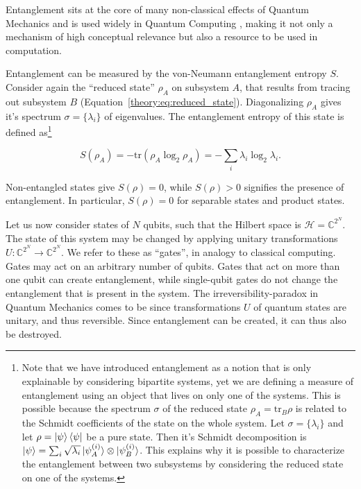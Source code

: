 \documentclass[reprint,amsmath,amssymb,aps,prb,nofootinbib]{revtex4-2}
\begin{document}
    Entanglement sits at the core of many non-classical effects of Quantum Mechanics \cite{Einstein:1935:EPR} and
    is used widely in Quantum Computing \cite{Harrow:2009:hhlAlgorithm,Shor:1997:PolyTimeFactorizing}, making it
    not only a mechanism of high conceptual relevance but also a resource to be used in computation.

    Entanglement can be measured by the von-Neumann entanglement entropy $S$. Consider again the ``reduced state''
    $\rho_A$ on subsystem $A$, that results from tracing out subsystem $B$ (Equation~\ref{theory:eq:reduced_state}).
    Diagonalizing $\rho_A$ gives it's spectrum $\sigma=\{\lambda_i\}$ of eigenvalues. The entanglement entropy of
    this state is defined as\footnote{Note that we have introduced entanglement as a notion that is only explainable
    by considering bipartite systems, yet we are defining a measure of entanglement using an object that lives on
    only one of the systems. This is possible because the spectrum $\sigma$ of the reduced state $\rho_A=\text{tr}_B\rho$
    is related to the Schmidt coefficients of the state on the whole system. Let $\sigma=\{\lambda_i\}$ and let
    $\rho=\ket{\psi}\bra{\psi}$ be a pure state. Then it's Schmidt decomposition is
    $\ket{\psi}=\sum_i\sqrt{\lambda_i}\ket{\psi_A^{(i)}}\otimes\ket{\psi_B^{(i)}}$. This explains why it is possible to
    characterize the entanglement between two subsystems by considering the reduced state on one of the systems.}

    \begin{equation}
        S(\rho_A) = -\text{tr}\left(\rho_A\log_2\rho_A\right) = -\sum_i\lambda_i\log_2\lambda_i.
    \end{equation}

    Non-entangled states give $S(\rho)=0$, while $S(\rho)>0$ signifies the presence of entanglement. In particular,
    $S(\rho)=0$ for separable states and product states.

    \vspace{\baselineskip}

    Let us now consider states of $N$ qubits, such that the Hilbert space is $\mathcal{H}=\mathbb{C}^{2^N}$. The state of this system may be changed by applying unitary transformations
    $U:\mathbb{C}^{2^N}\rightarrow\mathbb{C}^{2^N}$. We refer to these as ``gates'', in analogy to classical
    computing. Gates may act on an arbitrary number of qubits. Gates that act on more than one qubit can create
    entanglement, while single-qubit gates do not change the entanglement that is present in the system.
    The irreversibility-paradox in Quantum Mechanics comes to be since transformations $U$ of quantum states are
    unitary, and thus reversible. Since entanglement can be created, it can thus also be destroyed.
\end{document}
